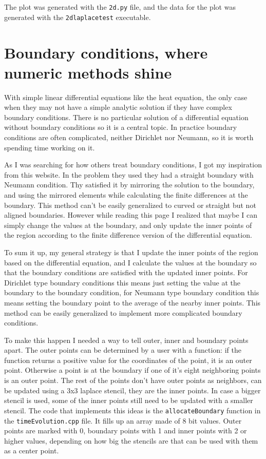 \documentclass[pdftex,12pt,a4paper]{article}
\begin{document}
		The plot was generated with the \texttt{2d.py} file, and the data for the plot was generated with the \texttt{2dlaplacetest} executable.
	\section{Boundary conditions, where numeric methods shine}
		With simple linear differential equations like the heat equation, the only case when they may not have a simple analytic solution if they have complex boundary conditions. There is no particular solution of a differential equation without boundary conditions so it is a central topic. In practice boundary conditions are often complicated, neither Dirichlet nor Neumann, so it is worth spending time working on it.
		
		As I was searching for how others treat boundary conditions, I got my inspiration from this website. \cite{lectureNotes} In the problem they used they had a straight boundary with Neumann condition. Thy satisfied it by mirroring the solution to the boundary, and using the mirrored elements while calculating the finite differences at the boundary. This method can't be easily generalized to curved or straight but not aligned boundaries. However while reading this page I realized that maybe I can simply change the values at the boundary, and only update the inner points of the region according to the finite difference version of the differential equation.
		
		To sum it up, my general strategy is that I update the inner points of the region based on the differential equation, and I calculate the values at the boundary so that the boundary conditions are satisfied with the updated inner points. For Dirichlet type boundary conditions this means just setting the value at the boundary to the boundary condition, for Neumann type boundary condition this means setting the boundary point to the average of the nearby inner points. This method can be easily generalized to implement more complicated boundary conditions.
		
		To make this happen I needed a way to tell outer, inner and boundary points apart. The outer points can be determined by a user with a function: if the function returns a positive value for the coordinates of the point, it is an outer point. Otherwise a point is at the boundary if one of it's eight neighboring points is an outer point. The rest of the points don't have outer points as neighbors, can be updated using a 3x3 laplace stencil, they are the inner points. In case a bigger stencil is used, some of the inner points still need to be updated with a smaller stencil. The code that implements this ideas is the \texttt{allocateBoundary} function in the \texttt{timeEvolution.cpp} file. It fills up an array made of 8 bit values. Outer points are marked with 0, boundary points with 1 and inner points with 2 or higher values, depending on how big the stencils are that can be used with them as a center point.
		
\end{document}
